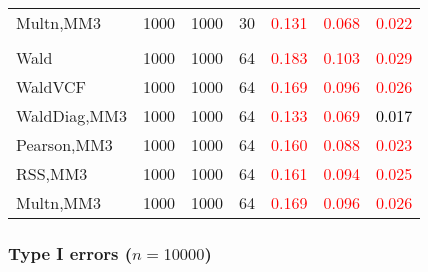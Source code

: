 \documentclass[
]{article}
\begin{document}
\begin{table}[H]
{\begin{tabular}[t]{lrrrrrr}
\hspace{1em}Multn,MM3 & 1000 & 1000 & 30 & \textcolor{red}{0.131} & \textcolor{red}{0.068} & \textcolor{red}{0.022}\\
\addlinespace[0.3em]
\multicolumn{7}{l}{\textbf{3F 15V}}\\
\hspace{1em}Wald & 1000 & 1000 & 64 & \textcolor{red}{0.183} & \textcolor{red}{0.103} & \textcolor{red}{0.029}\\
\hspace{1em}WaldVCF & 1000 & 1000 & 64 & \textcolor{red}{0.169} & \textcolor{red}{0.096} & \textcolor{red}{0.026}\\
\hspace{1em}WaldDiag,MM3 & 1000 & 1000 & 64 & \textcolor{red}{0.133} & \textcolor{red}{0.069} & \textcolor{black}{0.017}\\
\hspace{1em}Pearson,MM3 & 1000 & 1000 & 64 & \textcolor{red}{0.160} & \textcolor{red}{0.088} & \textcolor{red}{0.023}\\
\hspace{1em}RSS,MM3 & 1000 & 1000 & 64 & \textcolor{red}{0.161} & \textcolor{red}{0.094} & \textcolor{red}{0.025}\\
\hspace{1em}Multn,MM3 & 1000 & 1000 & 64 & \textcolor{red}{0.169} & \textcolor{red}{0.096} & \textcolor{red}{0.026}\\
\bottomrule
\end{tabular}}
\endgroup{}
\end{table}

\hypertarget{type-i-errors-n10000-3}{%
\subsubsection{\texorpdfstring{Type I errors
(\(n=10000\))}{Type I errors (n=10000)}}\label{type-i-errors-n10000-3}}
\end{document}
